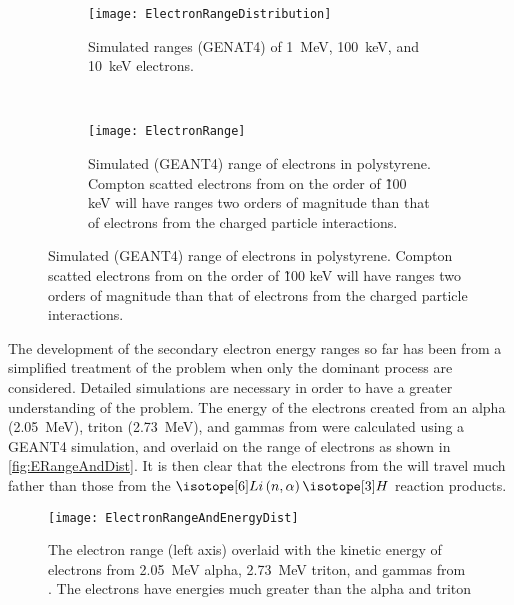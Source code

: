 \begin{figure}
  \centering
    \begin{subfigure}[b]{0.45\textwidth}
      \texttt{[image: ElectronRangeDistribution]}
      \caption[Range of \SI{1}{\MeV}, \SI{100}{\keV}, and \SI{10}{\keV} electrons]{Simulated ranges (GENAT4) of \SI{1}{\MeV}, \SI{100}{\keV}, and \SI{10}{\keV} electrons.}
    \end{subfigure}%
    ~
    \begin{subfigure}[b]{0.45\textwidth}
      \texttt{[image: ElectronRange]}
      \caption[Range of Electrons in Polystyrene]{Simulated (GEANT4) range of electrons in polystyrene. Compton scatted electrons from  on the order of  \~ 100 keV will have ranges two orders of magnitude than that of electrons from the charged particle interactions.}
    \end{subfigure}
  \label{fig:ElectronRanges}
\end{figure}

The development of the secondary electron energy ranges so far has been from a simplified treatment of the problem when only the dominant process are considered.
Detailed simulations are necessary in order to have a greater understanding of the problem. 
The energy of the electrons created from an alpha (\SI{2.05}{\MeV}), triton (\SI{2.73}{\MeV}), and gammas from  were calculated using a GEANT4 simulation, and overlaid on the range of electrons as shown in \autoref{fig:ERangeAndDist}.
It is then clear that the electrons from the  will travel much father than those from the $\iso[6]{Li}\left(n,\alpha\right)\iso[3]{H}$ reaction products.
\begin{figure}
  \centering
  \texttt{[image: ElectronRangeAndEnergyDist]}
  \caption[Electron Range and Energy Distribution of Selected Reactions]{The electron range (left axis) overlaid with the kinetic energy of electrons from \SI{2.05}{\MeV} alpha, \SI{2.73}{\MeV} triton, and gammas from . The  electrons have energies much greater than the alpha and triton}
  \label{fig:ERangeAndDist}
\end{figure}
